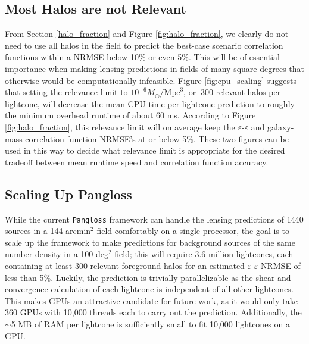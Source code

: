 \documentclass[%
 reprint,
 amsmath,amssymb,
 aps,nofootinbib
]{revtex4-1}
\begin{document}
\subsection{Most Halos are not Relevant}

From Section \ref{halo_fraction} and Figure \ref{fig:halo_fraction}, we clearly do not need to use all halos in the field to predict the best-case scenario correlation functions within a NRMSE below 10\% or even 5\%. This will be of essential importance when making lensing predictions in fields of many square degrees that otherwise would be computationally infeasible. Figure \ref{fig:cpu_scaling} suggests that setting the relevance limit to ${10^{-6}M_\odot/\text{Mpc}^3}$, or $~300$ relevant halos per lightcone, will decrease the mean CPU time per lightcone prediction to roughly the minimum overhead runtime of about 60 ms. According to Figure \ref{fig:halo_fraction}, this relevance limit will on average keep the $\varepsilon$-$\varepsilon$ and galaxy-mass correlation function NRMSE's at or below 5\%. These two figures can be used in this way to decide what relevance limit is appropriate for the desired tradeoff between mean runtime speed and correlation function accuracy. 


\subsection{Scaling Up Pangloss} \label{scaling_up}

While the current \texttt{Pangloss} framework can handle the lensing predictions of 1440 sources in a 144 arcmin$^2$ field comfortably on a single processor, the goal is to scale up the framework to make predictions for background sources of the same number density in a 100 deg$^2$ field; this will require 3.6 million lightcones, each containing at least 300 relevant foreground halos for an estimated $\varepsilon$-$\varepsilon$ NRMSE of less than 5\%. Luckily, the prediction is trivially parallelizable as the shear and convergence calculation of each lightcone is independent of all other lightcones. This makes GPUs an attractive candidate for future work, as it would only take 360 GPUs with 10,000 threads each to carry out the prediction. Additionally, the $\sim$5 MB of RAM per lightcone is sufficiently small to fit 10,000 lightcones on a GPU.
\end{document}
